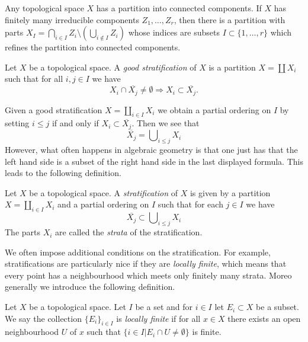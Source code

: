 \noindent
Any topological space $X$ has a partition into connected components.
If $X$ has finitely many irreducible components $Z_1, \ldots, Z_r$,
then there is a partition with parts
$X_I = \bigcap_{i \in I} Z_i \setminus (\bigcup_{i \not \in I} Z_i)$
whose indices are subsets $I \subset \{1, \ldots, r\}$
which refines the partition into connected components.

\begin{definition}
\label{definition-good-stratification}
Let $X$ be a topological space. A {\it good stratification}
of $X$ is a partition $X = \coprod X_i$ such that for all
$i, j \in I$ we have
$$
X_i \cap \overline{X_j} \not = \emptyset
\Rightarrow
X_i \subset \overline{X_j}.
$$
\end{definition}

\noindent
Given a good stratification $X = \coprod_{i \in I} X_i$ we obtain
a partial ordering on $I$ by setting $i \leq j$ if and only if
$X_i \subset \overline{X_j}$. Then we see that
$$
\overline{X_j} = \bigcup\nolimits_{i \leq j} X_i
$$
However, what often happens in algebraic geometry is that one just
has that the left hand side is a subset of the right hand side in
the last displayed formula. This leads to the following definition.

\begin{definition}
\label{definition-stratification}
Let $X$ be a topological space. A {\it stratification} of $X$ is
given by a partition $X = \coprod_{i \in I} X_i$ and a partial ordering
on $I$ such that for each $j \in I$ we have
$$
\overline{X_j} \subset \bigcup\nolimits_{i \leq j} X_i
$$
The parts $X_i$ are called the {\it strata} of the stratification.
\end{definition}

\noindent
We often impose additional conditions on the stratification.
For example, stratifications are particularly nice if they
are {\it locally finite}, which means that every point has a
neighbourhood which meets only finitely many strata. Moreo generally
we introduce the following definition.

\begin{definition}
\label{definition-locally-finite}
Let $X$ be a topological space. Let $I$ be a set and for $i \in I$
let $E_i \subset X$ be a subset. We say the collection $\{E_i\}_{i \in I}$
is {\it locally finite} if for all $x \in X$ there exists an open
neighbourhood $U$ of $x$ such that
$\{i \in I | E_i \cap U \not = \emptyset\}$ is finite.
\end{definition}


